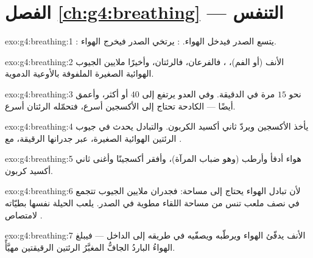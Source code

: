 \section*{الفصل \ref{ch:g4:breathing} --- التنفس}

\begin{solution}{exo:g4:breathing:1}
: يتسع الصدر فيدخل الهواء. : يرتخي الصدر فيخرج
الهواء.
\end{solution}

\begin{solution}{exo:g4:breathing:2}
الأنف (أو الفم)، ، فالفرعان، فالرئتان، وأخيرًا
ملايين الجيوب الهوائية الصغيرة الملفوفة بالأوعية الدموية.
\end{solution}

\begin{solution}{exo:g4:breathing:3}
نحو $15$ مرة في الدقيقة. وفي العدو يرتفع إلى $40$ أو أكثر، وأعمق
أيضًا ---  الكادحة تحتاج إلى الأكسجين أسرع، فتحمّله الرئتان
أسرع.
\end{solution}

\begin{solution}{exo:g4:breathing:4}
يأخذ الأكسجين ويردّ ثاني أكسيد الكربون. والتبادل يحدث في جيوب
الرئتين الهوائية الصغيرة، عبر جدرانها الرقيقة، مع .
\end{solution}

\begin{solution}{exo:g4:breathing:5}
هواء  أدفأ وأرطب (وهو ضباب المرآة)، وأفقر أكسجينًا وأغنى
ثاني أكسيد كربون.
\end{solution}

\begin{solution}{exo:g4:breathing:6}
لأن تبادل الهواء  يحتاج إلى مساحة: فجدران ملايين الجيوب
تتجمع في نصف ملعب تنس من مساحة اللقاء مطوية في الصدر.  يلعب الحيلة نفسها بطيّاته لامتصاص .
\end{solution}

\begin{solution}{exo:g4:breathing:7}
الأنف يدفّئ الهواء ويرطّبه ويصفّيه في طريقه إلى الداخل --- فيبلغ
الهواءُ الباردُ الجافُّ المغبَّرُ الرئتين الرقيقتين مهيَّأً.
\end{solution}

